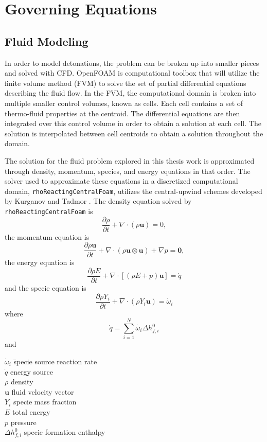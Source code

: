 \chapter{Governing Equations}
\label{math}

\section{Fluid Modeling}
In order to model detonations, the problem can be broken up into smaller pieces and solved with CFD. OpenFOAM is computational toolbox that will utilize the finite volume method (FVM) to solve the set of partial differential equations describing the fluid flow. In the FVM, the computational domain is broken into multiple smaller control volumes, known as cells. Each cell contains a set of thermo-fluid properties at the centroid. The differential equations are then integrated over this control volume in order to obtain a solution at each cell. The solution is interpolated between cell centroids to obtain a solution throughout the domain. 

The solution for the fluid problem explored in this thesis work is approximated through density, momentum, species, and energy equations in that order. The solver used to approximate these equations in a discretized computational domain, \verb|rhoReactingCentralFoam|, utilizes the central-upwind schemes developed by Kurganov and Tadmor \cite{kurganov1}. The density equation solved by \verb|rhoReactingCentralFoam| is
\begin{equation}
\frac{\partial \rho}{\partial t} + \nabla \cdot \left(\rho \bm{u}\right) = 0,
\end{equation}
the momentum equation is
\begin{equation}
\frac{\partial \rho\bm{u}}{\partial t} + \nabla \cdot \left(\rho \bm{u}\otimes \bm{u}\right) + \nabla p = \bm{0}, 
\end{equation}
the energy equation is
\begin{equation}
\frac{\partial \rho E}{\partial t} + \nabla \cdot \left[\left(\rho E + p\right)\bm{u}\right] = \dot{q}
\end{equation}
and the specie equation is
\begin{equation}
\frac{\partial \rho Y_i}{\partial t} + \nabla \cdot \left(\rho Y_i \bm{u}\right) = \dot{\omega}_i
\end{equation}
where 
\begin{equation}
\dot{q} = \sum_{i = 1}^N \dot{\omega_i} \Delta h_{f,i}^0
\end{equation}
and
\begin{tabbing}
\qquad \= \(\dot{\omega}_i\) \qquad \= specie source reaction rate \\ 
\> \(\dot{q}\) \> energy source \\
\> \(\rho\) \> density \\
\> \(\bm{u}\) \> fluid velocity vector \\
\> \(Y_i\) \> specie mass fraction \\
\> \(E\) \> total energy \\
\> \(p\) \> pressure\\
\> \(\Delta h_{f,i}^0\) \> specie formation enthalpy
\end{tabbing}

